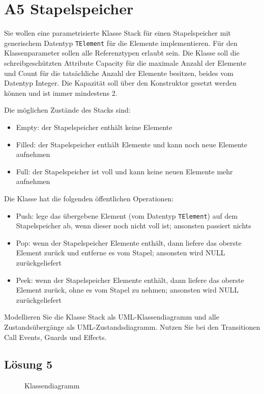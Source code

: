 \documentclass[main.tex]{subfiles}
\begin{document}
\section{A5 Stapelspeicher}
Sie wollen eine parametrisierte Klasse Stack für einen Stapelspeicher mit generischem Datentyp \texttt{TElement} für die Elemente implementieren. Für den Klassenparameter sollen alle Referenztypen erlaubt sein. Die Klasse soll die schreibgeschützten Attribute Capacity für die maximale Anzahl der Elemente und Count für die tatsächliche Anzahl der Elemente besitzen, beides vom Datentyp Integer.
Die Kapazität soll über den Konstruktor gesetzt werden können und ist immer mindestens 2.

Die möglichen Zustände des Stacks sind:
\begin{itemize}
    \item Empty: der Stapelspeicher enthält keine Elemente
    \item Filled: der Stapelspeicher enthält Elemente und kann noch neue Elemente aufnehmen
    \item Full: der Stapelspeicher ist voll und kann keine neuen Elemente mehr aufnehmen
\end{itemize}

Die Klasse hat die folgenden öffentlichen Operationen:
\begin{itemize}
    \item Push: lege das übergebene Element (vom Datentyp \texttt{TElement}) auf dem Stapelspeicher ab, wenn dieser noch nicht voll ist; ansonsten passiert nichts
    \item Pop: wenn der Stapelspeicher Elemente enthält, dann liefere das oberste Element zurück und entferne es vom Stapel; ansonsten wird NULL zurückgeliefert
    \item Peek: wenn der Stapelspeicher Elemente enthält, dann liefere das oberste Element zurück, ohne es vom Stapel zu nehmen; ansonsten wird NULL zurückgeliefert
\end{itemize}

Modellieren Sie die Klasse Stack als UML-Klassendiagramm und alle Zustandsübergänge als UML-Zustandsdiagramm. Nutzen Sie bei den Transitionen Call Events, Guards und Effects.

\subsection{Lösung 5}
\begin{figure}[h!]
    \caption{Klassendiagramm}
    \label{fig:lgs5a}
\end{figure}
\end{document}
